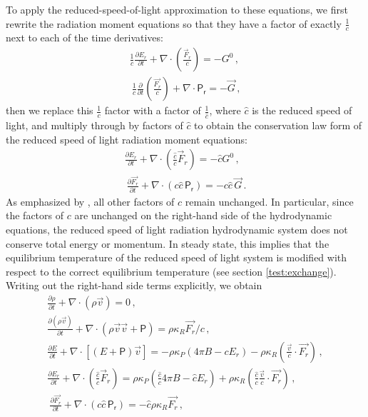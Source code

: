 \documentclass[fleqn,usenatbib]{mnras}
\begin{document}
To apply the reduced-speed-of-light approximation to these equations, we first rewrite the radiation moment equations so that they have a factor of exactly $\frac{1}{c}$ next to each of the time derivatives:
\begin{align}
    \frac{1}{c} \frac{\partial E_r}{\partial t} + \nabla \cdot \left( \frac{\vec{F}_r}{c} \right) = -G^0 \, , \\\
    \frac{1}{c} \frac{\partial}{\partial t} \left( \frac{\vec{F_r}}{c} \right) + \nabla \cdot \mathsf{P_r} = -\vec{G} \, ,
\end{align}
then we replace this $\frac{1}{c}$ factor with a factor of $\frac{1}{\hat c}$, where $\hat c$ is the reduced speed of light, and multiply through by factors of $\hat c$ to obtain the conservation law form of the reduced speed of light radiation moment equations:
\begin{align}
    \frac{\partial E_r}{\partial t} + \nabla \cdot \left( \frac{\hat c}{c} \vec{F}_r \right) = -\hat c G^0 \, , \\\
    \frac{\partial \vec{F_r}}{\partial t} + \nabla \cdot (c \hat c \, \mathsf{P_r}) = -c \hat c \, \vec{G} \, .
\end{align}
As emphasized by \cite{Skinner_2013}, all other factors of $c$ remain unchanged. In particular, since the factors of $c$ are unchanged on the right-hand side of the hydrodynamic equations, the reduced speed of light radiation hydrodynamic system does not conserve total energy or momentum. In steady state, this implies that the equilibrium temperature of the reduced speed of light system is modified with respect to the correct equilibrium temperature (see section \ref{test:exchange}). Writing out the right-hand side terms explicitly, we obtain
\begin{align}
    \frac{\partial \rho}{\partial t} + \nabla \cdot (\rho \vec{v}) = 0 \, , \\
    \frac{\partial (\rho \vec{v})}{\partial t} + \nabla \cdot (\rho \vec{v} \vec{v} + \mathsf{P}) = \rho \kappa_R {\vec{F_r} / c} \, , \\
    \frac{\partial E}{\partial t} + \nabla \cdot \left[(E + \mathsf{P})\vec{v}\right] = -\rho \kappa_P (4 \pi B - c E_r) - \rho \kappa_R \left( \frac{\vec{v}}{c} \cdot \vec{F_r} \right) \, , \\
    \frac{\partial E_r}{\partial t} + \nabla \cdot \left( \frac{\hat c}{c} \vec{F}_r \right) = \rho \kappa_P \left( \frac{\hat c}{c} 4 \pi B - \hat c E_r \right) + \rho \kappa_R \left( \frac{\hat c}{c} \frac{\vec{v}}{c} \cdot \vec{F_r} \right) \, , \\\
    \frac{\partial \vec{F_r}}{\partial t} + \nabla \cdot (c \hat c \, \mathsf{P_r}) = -\hat c \rho \kappa_R \vec{F_r} \, ,
\end{align}
\end{document}
